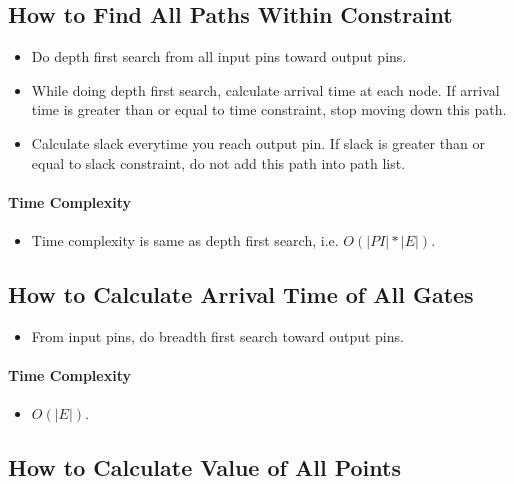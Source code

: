 \documentclass[]{article}
\providecommand{\tightlist}{%
  \setlength{\itemsep}{0pt}\setlength{\parskip}{0pt}}
\let\oldparagraph\paragraph
\renewcommand{\paragraph}[1]{\oldparagraph{#1}\mbox{}}
\begin{document}
\subsection{How to Find All Paths Within
Constraint}\label{how-to-find-all-paths-within-constraint}

\begin{itemize}
\item
  Do depth first search from all input pins toward output pins.
\item
  While doing depth first search, calculate arrival time at each node.
  If arrival time is greater than or equal to time constraint, stop
  moving down this path.
\item
  Calculate slack everytime you reach output pin. If slack is greater
  than or equal to slack constraint, do not add this path into path
  list.
\end{itemize}

\paragraph{Time Complexity}\label{time-complexity-1}

\begin{itemize}
\tightlist
\item
  Time complexity is same as depth first search, i.e. \(O(|PI| * |E|)\).
\end{itemize}

\subsection{How to Calculate Arrival Time of All
Gates}\label{how-to-calculate-arrival-time-of-all-gates}

\begin{itemize}
\tightlist
\item
  From input pins, do breadth first search toward output pins.
\end{itemize}

\paragraph{Time Complexity}\label{time-complexity-2}

\begin{itemize}
\tightlist
\item
  \(O(|E|)\).
\end{itemize}

\subsection{How to Calculate Value of All
Points}\label{how-to-calculate-value-of-all-points}
\end{document}
